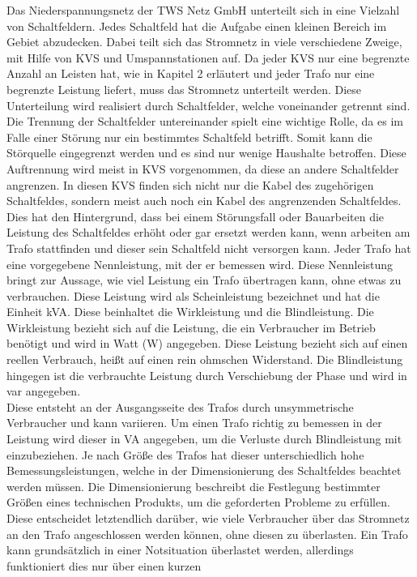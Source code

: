 Das Niederspannungsnetz der TWS Netz GmbH unterteilt sich in eine Vielzahl von Schaltfeldern. Jedes Schaltfeld hat die Aufgabe einen kleinen Bereich im Gebiet 
abzudecken. Dabei teilt sich das Stromnetz in viele verschiedene Zweige, mit Hilfe von KVS und Umspannstationen auf. Da jeder KVS nur eine begrenzte Anzahl an 
Leisten hat, wie in Kapitel 2 erläutert und jeder Trafo nur eine begrenzte Leistung liefert, muss das Stromnetz unterteilt werden. Diese Unterteilung wird 
realisiert durch Schaltfelder, welche voneinander getrennt sind. Die Trennung der Schaltfelder untereinander spielt eine wichtige Rolle, da es im Falle einer 
Störung nur ein bestimmtes Schaltfeld betrifft. Somit kann die Störquelle eingegrenzt werden und es sind nur wenige Haushalte betroffen. Diese Auftrennung 
wird meist in KVS vorgenommen, da diese an andere Schaltfelder angrenzen. In diesen KVS finden sich nicht nur die Kabel des zugehörigen Schaltfeldes, sondern 
meist auch noch ein Kabel des angrenzenden Schaltfeldes. Dies hat den Hintergrund, dass bei einem Störungsfall oder Bauarbeiten die Leistung des Schaltfeldes 
erhöht oder gar ersetzt werden kann, wenn \zB arbeiten am Trafo stattfinden und dieser sein Schaltfeld nicht versorgen kann. Jeder Trafo hat eine vorgegebene
Nennleistung, mit der er bemessen wird. Diese Nennleistung bringt zur Aussage, wie viel Leistung ein Trafo übertragen kann, ohne etwas zu verbrauchen. Diese 
Leistung wird als Scheinleistung bezeichnet und hat die Einheit kVA. Diese beinhaltet die Wirkleistung und die Blindleistung. Die Wirkleistung bezieht sich 
auf die Leistung, die ein Verbraucher im Betrieb benötigt und wird in Watt (W) angegeben. Diese Leistung bezieht sich auf einen reellen Verbrauch, heißt auf 
einen rein ohmschen Widerstand. Die Blindleistung hingegen ist die verbrauchte Leistung durch Verschiebung der Phase und wird in var angegeben. \autocite{Hufschmid.2021} 
\\
Diese entsteht an der Ausgangsseite des Trafos durch unsymmetrische Verbraucher und kann variieren. Um einen Trafo richtig zu bemessen in der Leistung wird 
dieser in VA angegeben, um die Verluste durch Blindleistung mit einzubeziehen. Je nach Größe des Trafos hat dieser unterschiedlich hohe Bemessungsleistungen, welche 
in der Dimensionierung des Schaltfeldes beachtet werden müssen. Die Dimensionierung beschreibt die Festlegung bestimmter Größen eines technischen Produkts, 
um die geforderten Probleme zu erfüllen. Diese entscheidet letztendlich darüber, wie viele Verbraucher über das Stromnetz an den Trafo angeschlossen werden 
können, ohne diesen zu überlasten. Ein Trafo kann grundsätzlich in einer Notsituation überlastet werden, allerdings funktioniert dies nur über einen kurzen 

